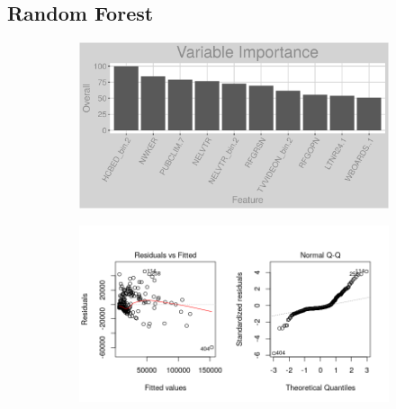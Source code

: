 \subsection{Random Forest}
\label{appendix:district_heat:rf}
\begin{figure}[h]
\centering
\begin{subfigure}{1\textwidth}
\centering
\includegraphics[width=.99\textwidth, height=0.3\textheight]{Images/district_heat_rf_vars.png}
\end{subfigure}
\begin{subfigure}{1\textwidth}
\centering
\includegraphics[width=.99\textwidth, height=0.475\textheight]{Images/district_heat_rf_res_1.png}
\end{subfigure}
\end{figure}
\FloatBarrier
\newpage
